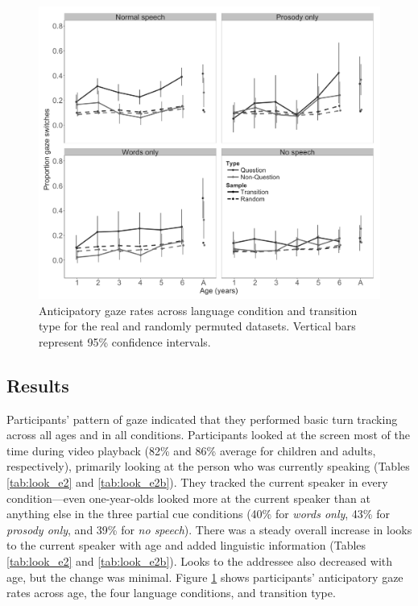 \documentclass[authoryear, 12pt]{elsarticle}
\begin{document}
\begin{figure}[!ht]
\begin{center}
\includegraphics[width=\textwidth]{figures/E2-samples-by-lang-groups-trans-types.png}
\end{center}
\caption{Anticipatory gaze rates across language condition and transition type for the real and randomly permuted datasets. Vertical bars represent 95\% confidence intervals.} 
\label{fig:E2-randvsreal}
\end{figure}

\subsection*{Results}
\label{sec:results2}

Participants' pattern of gaze indicated that they performed basic turn tracking across all ages and in all conditions. Participants looked at the screen most of the time during video playback (82\% and 86\% average for children and adults, respectively), primarily looking at the person who was currently speaking (Tables \ref{tab:look_e2} and \ref{tab:look_e2b}). They tracked the current speaker in every condition---even one-year-olds looked more at the current speaker than at anything else in the three partial cue conditions (40\% for \textit{words only}, 43\% for \textit{prosody only}, and 39\% for \textit{no speech}). There was a steady overall increase in looks to the current speaker with age and added linguistic information (Tables \ref{tab:look_e2} and \ref{tab:look_e2b}). Looks to the addressee also decreased with age, but the change was minimal. Figure \ref{fig:E2-randvsreal} shows participants' anticipatory gaze rates across age, the four language conditions, and transition type.
\end{document}
